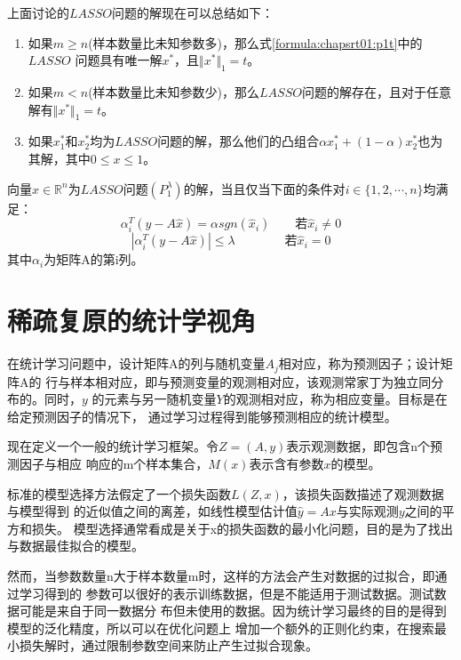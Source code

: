 上面讨论的$ LASSO $问题的解现在可以总结如下：
\begin{theorem}[Osborne et al., 2000b]\quad\par
\begin{enumerate}
	\item 如果$ m\geq n$(样本数量比未知参数多)，那么式\ref{formula:chapsrt01:p1t}中的$ LASSO$ 问题具有唯一解$ x^*$，且$ \Vert x^*\Vert_1 =t $。
	\item 如果$ m<n $(样本数量比未知参数少)，那么$ LASSO $问题的解存在，且对于任意解有$ \Vert x^*\Vert_1 =t $。
	\item 如果$ x_1^* $和$ x_2^* $均为$ LASSO $问题的解，那么他们的凸组合$\alpha x_1^* +(1-\alpha)x_2^* $也为其解，其中$ 0\leq x\leq 1 $。
\end{enumerate}
\end{theorem}

\begin{lemma}[最优性条件]
向量$ \hat{x}\in\mathbb{R}^n $为$ LASSO $问题$ (P_1^{\lambda}) $的解，当且仅当下面的条件对$ i\in \{1,2,\cdots,n\} $均满足：
\[ \alpha^T_i(y-A\hat{x}) = \alpha sgn(\hat{x}_i)\qquad \mbox{若}\hat{x}_i\neq 0\]
\[ |\alpha^T_i(y-A\hat{x})|\leq \lambda \qquad\qquad \mbox{若}\hat{x}_i= 0 \]
其中$ \alpha_i $为矩阵A的第i列。
\end{lemma}


\section{稀疏复原的统计学视角}

在统计学习问题中，设计矩阵A的列与随机变量$ A_j $相对应，称为预测因子；设计矩阵A的
行与样本相对应，即与预测变量的观测相对应，该观测常家丁为独立同分布的。同时，$ y $
的元素与另一随机变量$ Y $的观测相对应，称为相应变量。目标是在给定预测因子的情况下，
通过学习过程得到能够预测相应的统计模型。

现在定义一个一般的统计学习框架。令$ Z=(A,y) $表示观测数据，即包含n个预测因子与相应
响应的m个样本集合，$ M(x) $表示含有参数$ x $的模型。

标准的模型选择方法假定了一个损失函数$ L(Z,x) $，该损失函数描述了观测数据与模型得到
的近似值之间的离差，如线性模型估计值$ \hat{y}=Ax $与实际观测$ y $之间的平方和损失。
模型选择通常看成是关于x的损失函数的最小化问题，目的是为了找出与数据最佳拟合的模型。

然而，当参数数量n大于样本数量m时，这样的方法会产生对数据的过拟合，即通过学习得到的
参数可以很好的表示训练数据，但是不能适用于测试数据。测试数据可能是来自于同一数据分
布但未使用的数据。因为统计学习最终的目的是得到模型的泛化精度，所以可以在优化问题上
增加一个额外的正则化约束，在搜索最小损失解时，通过限制参数空间来防止产生过拟合现象。

